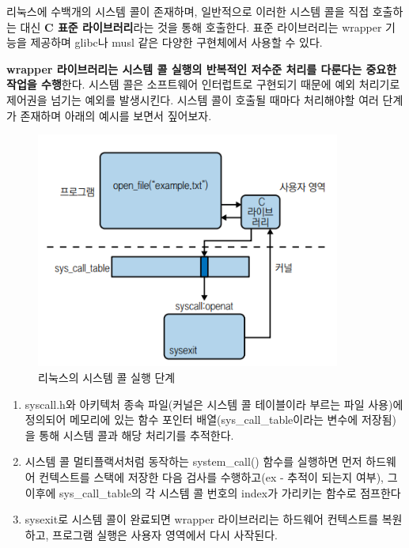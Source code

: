 \begin{flushleft}
    리눅스에 수백개의 시스템 콜이 존재하며,
    일반적으로 이러한 시스템 콜을 직접 호출하는 대신 \textbf{C 표준 라이브러리}라는 것을 통해 호출한다.
    표준 라이브러리는 wrapper 기능을 제공하며 glibc나 musl 같은 다양한 구현체에서 사용할 수 있다.
\end{flushleft}

\begin{flushleft}
    \textbf{wrapper 라이브러리는 시스템 콜 실행의 반복적인 저수준 처리를 다룬다는 중요한 작업을 수행}한다.
    시스템 콜은 소프트웨어 인터럽트로 구현되기 때문에 예외 처리기로 제어권을 넘기는 예외를 발생시킨다.
    시스템 콜이 호출될 때마다 처리해야할 여러 단계가 존재하며 아래의 예시를 보면서 짚어보자.
\end{flushleft}

\begin{figure}[h]
    \centering
    \includegraphics[width=10cm]{resource/2-4.png}
    \caption{리눅스의 시스템 콜 실행 단계}
\end{figure}

\begin{enumerate}
    \item syscall.h와 아키텍처 종속 파일(커널은 시스템 콜 테이블이라 부르는 파일 사용)에 정의되어
        메모리에 있는 함수 포인터 배열(sys\_call\_table이라는 변수에 저장됨)을 통해
        시스템 콜과 해당 처리기를 추적한다. 
    \item 시스템 콜 멀티플랙서처럼 동작하는 system\_call() 함수를 실행하면
        먼저 하드웨어 컨텍스트를 스택에 저장한 다음 검사를 수행하고(ex - 추적이 되는지 여부),
        그 이후에 sys\_call\_table의 각 시스템 콜 번호의 index가 가리키는 함수로 점프한다
    \item sysexit로 시스템 콜이 완료되면 wrapper 라이브러리는 하드웨어 컨텍스트를 복원하고,
        프로그램 실행은 사용자 영역에서 다시 사작된다.
\end{enumerate}

